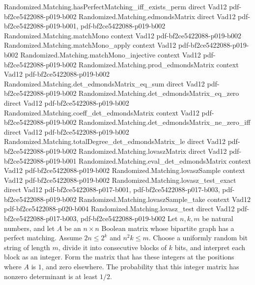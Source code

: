 \begin{theorem}
  {Randomized.Matching.hasPerfectMatching_iff_exists_perm}
  {direct}
  {Vad12}
  {pdf-bf2ce5422088-p019-b002}
\proofstep
  {Randomized.Matching.edmondsMatrix}
  {direct}
  {Vad12}
  {pdf-bf2ce5422088-p019-b001,
    pdf-bf2ce5422088-p019-b002}
\proofstep
  {Randomized.Matching.matchMono}
  {context}
  {Vad12}
  {pdf-bf2ce5422088-p019-b002}
\proofstep
  {Randomized.Matching.matchMono_apply}
  {context}
  {Vad12}
  {pdf-bf2ce5422088-p019-b002}
\proofstep
  {Randomized.Matching.matchMono_injective}
  {context}
  {Vad12}
  {pdf-bf2ce5422088-p019-b002}
\proofstep
  {Randomized.Matching.prod_edmondsMatrix}
  {context}
  {Vad12}
  {pdf-bf2ce5422088-p019-b002}
\proofstep
  {Randomized.Matching.det_edmondsMatrix_eq_sum}
  {direct}
  {Vad12}
  {pdf-bf2ce5422088-p019-b002}
\proofstep
  {Randomized.Matching.det_edmondsMatrix_eq_zero}
  {direct}
  {Vad12}
  {pdf-bf2ce5422088-p019-b002}
\proofstep
  {Randomized.Matching.coeff_det_edmondsMatrix}
  {context}
  {Vad12}
  {pdf-bf2ce5422088-p019-b002}
\proofstep
  {Randomized.Matching.det_edmondsMatrix_ne_zero_iff}
  {direct}
  {Vad12}
  {pdf-bf2ce5422088-p019-b002}
\proofstep
  {Randomized.Matching.totalDegree_det_edmondsMatrix_le}
  {direct}
  {Vad12}
  {pdf-bf2ce5422088-p019-b002}
\proofstep
  {Randomized.Matching.lovaszMatrix}
  {direct}
  {Vad12}
  {pdf-bf2ce5422088-p019-b001}
\proofstep
  {Randomized.Matching.eval_det_edmondsMatrix}
  {context}
  {Vad12}
  {pdf-bf2ce5422088-p019-b002}
\proofstep
  {Randomized.Matching.lovaszSample}
  {context}
  {Vad12}
  {pdf-bf2ce5422088-p019-b002}
\proofstep
  {Randomized.Matching.lovasz_test_exact}
  {direct}
  {Vad12}
  {pdf-bf2ce5422088-p017-b001,
    pdf-bf2ce5422088-p017-b003,
    pdf-bf2ce5422088-p019-b002}
\proofstep
  {Randomized.Matching.lovaszSample_take}
  {context}
  {Vad12}
  {pdf-bf2ce5422088-p020-b004}
\proofstep
  {Randomized.Matching.lovasz_test}
  {direct}
  {Vad12}
  {pdf-bf2ce5422088-p017-b003,
    pdf-bf2ce5422088-p019-b002}
Let $n,k,m$ be natural numbers, and let $A$ be an $n\times n$ Boolean matrix whose
bipartite graph has a perfect matching. Assume $2n\le 2^k$ and $n^2k\le m$. Choose a
uniformly random bit string of length $m$, divide it into consecutive blocks of $k$
bits, and interpret each block as an integer. Form the matrix that has these integers at
the positions where $A$ is $1$, and zero elsewhere. The probability that this integer
matrix has nonzero determinant is at least $1/2$.
\end{theorem}

